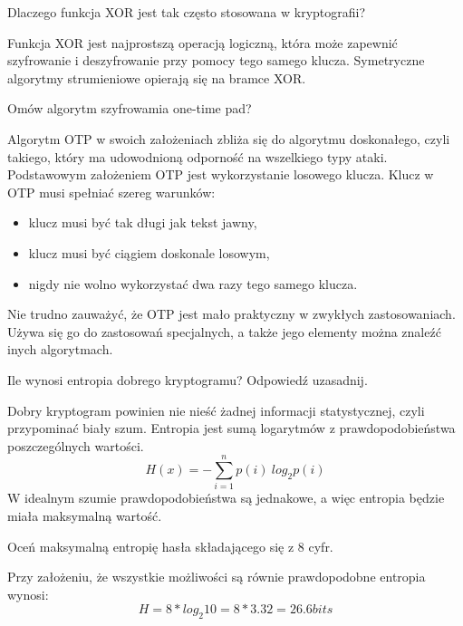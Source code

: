 \documentclass[answers,11pt]{exam}
\begin{document}
\begin{questions}

\question Dlaczego funkcja XOR jest tak często stosowana w kryptografii?
\begin{solution}
Funkcja XOR jest najprostszą operacją logiczną, która może zapewnić szyfrowanie i deszyfrowanie przy pomocy tego samego klucza. Symetryczne algorytmy strumieniowe opierają się na bramce XOR.
\end{solution}

\question Omów algorytm szyfrowamia one-time pad?
\begin{solution}
Algorytm OTP w swoich założeniach zbliża się do algorytmu doskonałego, czyli takiego, który ma udowodnioną odporność na wszelkiego typy ataki. Podstawowym założeniem OTP jest wykorzystanie losowego klucza. Klucz w OTP musi spełniać szereg warunków:
\begin{itemize}
\item klucz musi być tak długi jak tekst jawny,
\item klucz musi być ciągiem doskonale losowym,
\item nigdy nie wolno wykorzystać dwa razy tego samego klucza.
\end{itemize}
Nie trudno zauważyć, że OTP jest mało praktyczny w zwykłych zastosowaniach. Używa się go do zastosowań specjalnych, a także jego elementy można znaleźć inych algorytmach.
\end{solution}

\question Ile wynosi entropia dobrego kryptogramu? Odpowiedź uzasadnij.
\begin{solution}
Dobry kryptogram powinien nie nieść żadnej informacji statystycznej, czyli przypominać biały szum. Entropia jest sumą logarytmów z prawdopodobieństwa poszczególnych wartości.
\begin{equation}
H(x)= - \sum_{i=1}^n p(i) \ log_2 p(i)
\end{equation}
W idealnym szumie prawdopodobieństwa są jednakowe, a więc entropia będzie miała maksymalną wartość. 
\end{solution}

\question Oceń maksymalną entropię hasła składającego się z 8 cyfr.
\begin{solution}
Przy założeniu, że wszystkie możliwości są równie prawdopodobne entropia wynosi:
\begin{equation}
H = 8 * log_2 10 = 8 * 3.32 = 26.6 bits
\end{equation}
\end{solution}


\end{questions}
\end{document}
